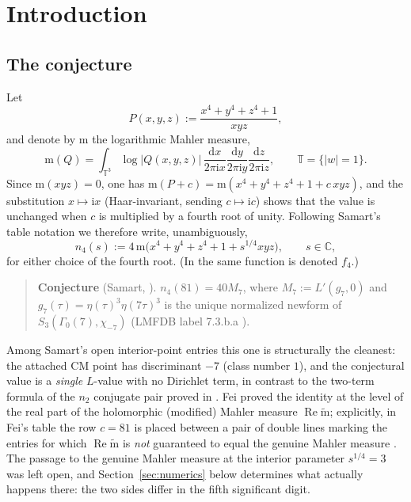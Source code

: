 \documentclass[11pt]{article}
\theoremstyle{definition}
\theoremstyle{remark}
\newcommand{\Cc}{\mathbb{C}}
\newcommand{\Tt}{\mathbb{T}}
\newcommand{\ii}{\mathrm{i}}
\newcommand{\id}{\mathrm{d}}
\newcommand{\ReT}{\operatorname{Re}}
\newcommand{\m}{\mathrm{m}}
\newcommand{\mt}{\widetilde{\m}}
\begin{document}
\section{Introduction}

\subsection{The conjecture}

Let
\[
  P(x,y,z):=\frac{x^4+y^4+z^4+1}{xyz},
\]
and denote by $\m$ the logarithmic Mahler measure,
\[
  \m(Q)=\int_{\Tt^3}\log|Q(x,y,z)|\,
  \frac{\id x}{2\pi \ii x}\frac{\id y}{2\pi \ii y}\frac{\id z}{2\pi \ii z},
  \qquad \Tt=\{|w|=1\}.
\]
Since $\m(xyz)=0$, one has $\m(P+c)=\m(x^4+y^4+z^4+1+c\,xyz)$, and the
substitution $x\mapsto \ii x$ (Haar-invariant, sending $c\mapsto \ii c$)
shows that the value is unchanged when $c$ is multiplied by a fourth
root of unity. Following Samart's table notation \cite{Sa15} we
therefore write, unambiguously,
\begin{equation}\label{eq:n4def}
  n_4(s):=4\,\m\bigl(x^4+y^4+z^4+1+s^{1/4}xyz\bigr),
  \qquad s\in\Cc,
\end{equation}
for either choice of the fourth root. (In \cite{Sa13} the same function
is denoted $f_4$.)

\begin{quote}
\textbf{Conjecture} (Samart, \cite[Table~6]{Sa15}).\quad
$n_4(81)=40M_7$, where $M_7:=L'(g_7,0)$ and
$g_7(\tau)=\eta(\tau)^3\eta(7\tau)^3$ is the unique normalized newform of
$S_3(\Gamma_0(7),\chi_{-7})$ \textup{(}LMFDB label \textup{7.3.b.a}
\cite{LMFDB}\textup{)}.
\end{quote}

Among Samart's open interior-point entries this one is structurally the
cleanest: the attached CM point has discriminant $-7$ (class number
$1$), and the conjectural value is a \emph{single} $L$-value with no
Dirichlet term, in contrast to the two-term formula of the $n_2$
conjugate pair proved in \cite{Zf}. Fei \cite{Fe} proved the identity at
the level of the real part of the holomorphic (modified) Mahler measure
$\ReT\mt$; explicitly, in Fei's table the row $c=81$ is placed between a
pair of double lines marking the entries for which $\ReT\mt$ is
\emph{not} guaranteed to equal the genuine Mahler measure
\cite[Note~(3) and Caution~2.3]{Fe}. The passage to the genuine Mahler
measure at the interior parameter $s^{1/4}=3$ was left open, and
Section~\ref{sec:numerics} below determines what actually happens
there: the two sides differ in the fifth significant digit.
\end{document}
